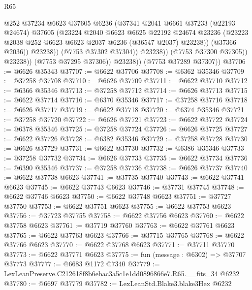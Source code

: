 \begin{lexlean}{R65}
\begin{coremodule}
{                            @252
                            @37234
                            @6623
                            @37605
                            @6236
                            (@37341
                              @2041
                              @6661
                              @37233
                              (@22193 @24674)
                              @37605
                              (@23224
                                @2040
                                @6623
                                @6625
                                @22192
                                @24674
                                @23236
                                (@23223 @2038 @252 @6623 @6623 @2037 @6236 (@36547 @2037) @23238))
                              (@37366 @2036))
                            @23238))
                        (@7753 @37302 @37304))
                      @23238))
                  (@7753 @37300 @37305))
                @23238))
            (@7753 @37295 @37306))
          @23238))
      (@7753 @37289 @37307))
@37706 := @6626 @35343
@37707 := @6622 @37706
@37708 := @6362 @35346
@37709 := @37258 @37708
@37710 := @6626 @37709
@37711 := @6622 @37710
@37712 := @6366 @35346
@37713 := @37258 @37712
@37714 := @6626 @37713
@37715 := @6622 @37714
@37716 := @6370 @35346
@37717 := @37258 @37716
@37718 := @6626 @37717
@37719 := @6622 @37718
@37720 := @6374 @35346
@37721 := @37258 @37720
@37722 := @6626 @37721
@37723 := @6622 @37722
@37724 := @6378 @35346
@37725 := @37258 @37724
@37726 := @6626 @37725
@37727 := @6622 @37726
@37728 := @6382 @35346
@37729 := @37258 @37728
@37730 := @6626 @37729
@37731 := @6622 @37730
@37732 := @6386 @35346
@37733 := @37258 @37732
@37734 := @6626 @37733
@37735 := @6622 @37734
@37736 := @6390 @35346
@37737 := @37258 @37736
@37738 := @6626 @37737
@37740 := @6622 @37738 @6623
@37741 := @37735 @37740
@37743 := @6622 @37741 @6623
@37745 := @6622 @37743 @6623
@37746 := @37731 @37745
@37748 := @6622 @37746 @6623
@37750 := @6622 @37748 @6623
@37751 := @37727 @37750
@37753 := @6622 @37751 @6623
@37755 := @6622 @37753 @6623
@37756 := @37723 @37755
@37758 := @6622 @37756 @6623
@37760 := @6622 @37758 @6623
@37761 := @37719 @37760
@37763 := @6622 @37761 @6623
@37765 := @6622 @37763 @6623
@37766 := @37715 @37765
@37768 := @6622 @37766 @6623
@37770 := @6622 @37768 @6623
@37771 := @37711 @37770
@37773 := @6622 @37771 @6623
@37775 := fun (message : @6302) => @37707 @37773
@37777 := @6683 @1172 @7340
@37779 := LexLeanPreserve.C212618f8b6ebac3a5c1e1dd0896866e7.R65.__fits_34 @6232
@37780 := @6697 @37779
@37782 := LexLeanStd.Blake3.blake3Hex @6232
}
\end{coremodule}
\end{lexlean}
